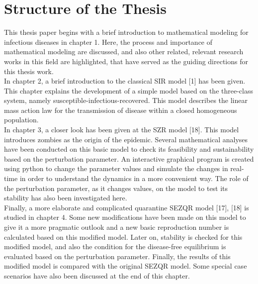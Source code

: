 \pagebreak
\section{Structure of the Thesis}

This thesis paper begins with a brief introduction to mathematical modeling for infectious diseases in chapter 1. Here, the process and importance of mathematical modeling are discussed, and also other related, relevant research works in this field are highlighted, that have served as the guiding directions for this thesis work. \\


In chapter 2, a brief introduction to the classical SIR model [1] has been given. This chapter explains the development of a simple model based on the three-class system, namely susceptible-infectious-recovered. This model describes the linear mass action law for the transmission of disease within a closed homogeneous population. \\


In chapter 3, a closer look has been given at the SZR model [18]. This model introduces zombies as the origin of the epidemic. Several mathematical analyses have been conducted on this basic model to check its feasibility and sustainability based on the perturbation parameter. An interactive graphical program is created using python to change the parameter values and simulate the changes in real-time in order to understand the dynamics in a more convenient way. The role of the perturbation parameter, as it changes values, on the model to test its stability has also been investigated here. \\


Finally, a more elaborate and complicated quarantine SEZQR model [17], [18] is studied in chapter 4. Some new modifications have been made on this model to give it a more pragmatic outlook and a new basic reproduction number is calculated based on this modified model. Later on, stability is checked for this modified model, and also the condition for the disease-free equilibrium is evaluated based on the perturbation parameter. Finally, the results of this modified model is compared with the original SEZQR model. Some special case scenarios have also been discussed at the end of this chapter.